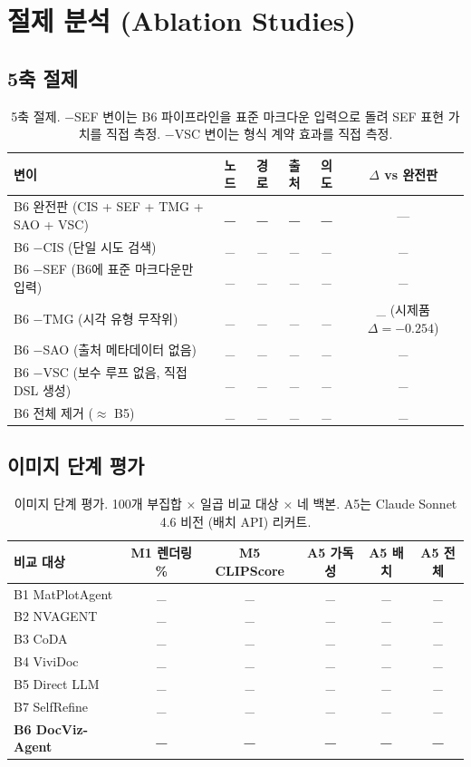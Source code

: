 \documentclass[11pt]{article}
\begin{document}
\section{절제 분석 (Ablation Studies)}

\subsection{5축 절제}

\begin{table}[h]
\centering
\small
\begin{tabular}{l|cccc|c}
\toprule
변이 & 노드 & 경로 & 출처 & 의도 & $\Delta$ vs 완전판 \\
\midrule
B6 완전판 (CIS + SEF + TMG + SAO + VSC) & \textbf{\_} & \textbf{\_} & \textbf{\_} & \textbf{\_} & — \\
B6 −CIS (단일 시도 검색) & \_ & \_ & \_ & \_ & \_ \\
B6 −SEF (B6에 표준 마크다운만 입력) & \_ & \_ & \_ & \_ & \_ \\
B6 −TMG (시각 유형 무작위) & \_ & \_ & \_ & \_ & \_ (시제품 $\Delta=-0.254$) \\
B6 −SAO (출처 메타데이터 없음) & \_ & \_ & \_ & \_ & \_ \\
B6 −VSC (보수 루프 없음, 직접 DSL 생성) & \_ & \_ & \_ & \_ & \_ \\
B6 전체 제거 ($\approx$ B5) & \_ & \_ & \_ & \_ & \_ \\
\bottomrule
\end{tabular}
\caption{5축 절제. −SEF 변이는 B6 파이프라인을 표준 마크다운 입력으로 돌려 SEF 표현 가치를 직접 측정. −VSC 변이는 형식 계약 효과를 직접 측정.}
\label{tab:t7}
\end{table}

\subsection{이미지 단계 평가}

\begin{table}[h]
\centering
\small
\begin{tabular}{l|c|c|ccc}
\toprule
비교 대상 & M1 렌더링 \% & M5 CLIPScore & A5 가독성 & A5 배치 & A5 전체 \\
\midrule
B1 MatPlotAgent & \_ & \_ & \_ & \_ & \_ \\
B2 NVAGENT & \_ & \_ & \_ & \_ & \_ \\
B3 CoDA & \_ & \_ & \_ & \_ & \_ \\
B4 ViviDoc & \_ & \_ & \_ & \_ & \_ \\
B5 Direct LLM & \_ & \_ & \_ & \_ & \_ \\
B7 SelfRefine & \_ & \_ & \_ & \_ & \_ \\
\textbf{B6 DocViz-Agent} & \textbf{\_} & \textbf{\_} & \textbf{\_} & \textbf{\_} & \textbf{\_} \\
\bottomrule
\end{tabular}
\caption{이미지 단계 평가. 100개 부집합 × 일곱 비교 대상 × 네 백본. A5는 Claude Sonnet 4.6 비전 (배치 API) 리커트.}
\label{tab:t8}
\end{table}
\end{document}

